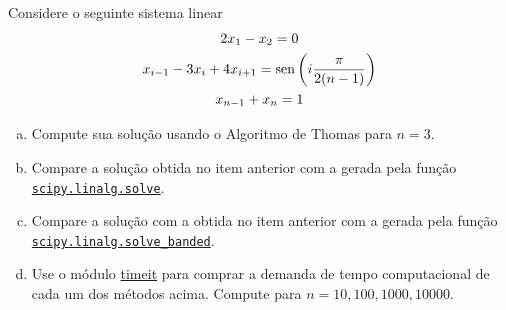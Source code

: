 \begin{exer}\label{exer:sislin_tridiag}
  Considere o seguinte sistema linear
  \begin{gather}
    2x_1 - x_2 = 0\\
    x_{i-1} - 3x_i + 4x_{i+1} = \operatorname{sen}\left(i\frac{\pi}{2(n-1)}\right)\\
    x_{n-1} + x_n = 1
  \end{gather}
  \begin{enumerate}[a)]
  \item Compute sua solução usando o Algoritmo de Thomas para $n=3$.
  \item Compare a solução obtida no item anterior com a gerada pela função \href{https://docs.scipy.org/doc/scipy/reference/generated/scipy.linalg.solve.html}{\lstinline+scipy.linalg.solve+}.
  \item Compare a solução com a obtida no item anterior com a gerada pela função \href{https://docs.scipy.org/doc/scipy/reference/generated/scipy.linalg.solve_banded.html}{\lstinline+scipy.linalg.solve_banded+}.
  \item Use o módulo {\python} \href{https://docs.python.org/3/library/timeit.html}{timeit} para comprar a demanda de tempo computacional de cada um dos métodos acima. Compute para $n=10,100,1000,10000$.
  \end{enumerate}
\end{exer}


